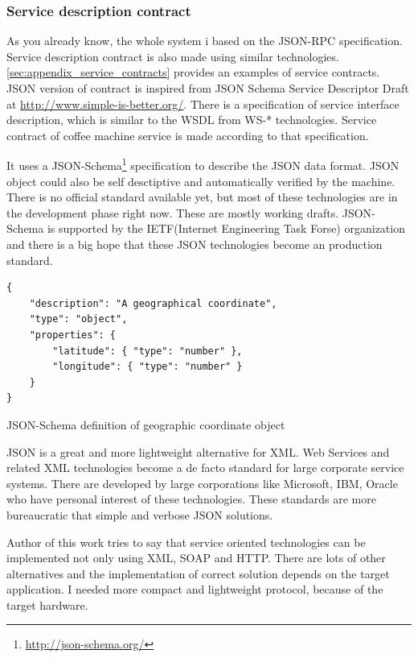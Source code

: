 \subsubsection{Service description contract}
\label{sec:service_json_contract}

As you already know, the whole system i based on the JSON-RPC specification.
Service description contract is also made using similar technologies.
\autoref{sec:appendix_service_contracts} provides an examples of service contracts.
JSON version of contract is inspired from JSON Schema Service Descriptor Draft at \url{http://www.simple-is-better.org/}.
There is a specification of service interface description, which is similar to the WSDL from WS-* technologies. 
Service contract of coffee machine service is made according to that specification.

It uses a JSON-Schema\footnote{\url{http://json-schema.org/}} specification to describe the JSON data format. 
JSON object could also be self desctiptive and automatically verified by the machine.
There is no official standard available yet, but most of these technologies are in the development phase right now. 
These are mostly working drafts.
JSON-Schema is supported by the IETF(Internet Engineering Task Forse) organization and there is a big hope that these JSON technologies become an production standard.


\begin{listing}[h]
\begin{verbatim}
{
    "description": "A geographical coordinate",
    "type": "object",
    "properties": {
        "latitude": { "type": "number" },
        "longitude": { "type": "number" }
    }
}
\end{verbatim}
\caption{JSON-Schema definition of geographic coordinate object}
\label{lst:json_schema_geo}
\end{listing}

JSON is a great and more lightweight alternative for XML.
Web Services and related XML technologies become a de facto standard for large corporate service systems. 
There are developed by large corporations like Microsoft, IBM, Oracle who have personal interest of these technologies.
These standards are more bureaucratic that simple and verbose JSON solutions. 

Author of this work tries to say that service oriented technologies can be implemented not only using XML, SOAP and HTTP.
There are lots of other alternatives and the implementation of correct solution
depends on the target application.
I needed more compact and lightweight protocol, because of the target hardware. 

